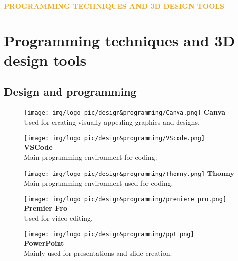 \newpage
\begin{center}
    \huge \textbf{\textcolor{orange}{PROGRAMMING TECHNIQUES AND 3D DESIGN TOOLS}} \\[0.5cm]
\end{center}

\section{\large \textbf{Programming techniques and 3D design tools}}
\subsection{\large \textbf{Design and programming}}

\begin{figure}[htbp]
    \centering
    \begin{minipage}{0.2\textwidth}
        \centering
        \texttt{[image: img/logo pic/design\&programming/Canva.png]}
        \vspace{0.3cm}
        \textbf{Canva}\\
        \small{Used for creating visually appealing graphics and designs.}
    \end{minipage}%
    \hfill
    \begin{minipage}{0.2\textwidth}
        \centering
        \texttt{[image: img/logo pic/design\&programming/VScode.png]}
        \vspace{0.3cm}
        \textbf{VSCode}\\
        \small{Main programming environment for coding.}
    \end{minipage}%
    \hfill
    \begin{minipage}{0.2\textwidth}
        \centering
        \texttt{[image: img/logo pic/design\&programming/Thonny.png]}
        \vspace{0.3cm}
        \textbf{Thonny}\\
        \small{Main programming environment used for coding.}
    \end{minipage}%
    \hfill
    \begin{minipage}{0.2\textwidth}
        \centering
        \texttt{[image: img/logo pic/design\&programming/premiere pro.png]}
        \vspace{0.3cm}
        \textbf{Premier Pro}\\
        \small{Used for video editing.}
    \end{minipage}%
    \hfill
    \begin{minipage}{0.2\textwidth}
        \centering
        \texttt{[image: img/logo pic/design\&programming/ppt.png]}
        \vspace{0.3cm}
        \textbf{PowerPoint}\\
        \small{Mainly used for presentations and slide creation.}
    \end{minipage}
    

\end{figure}
